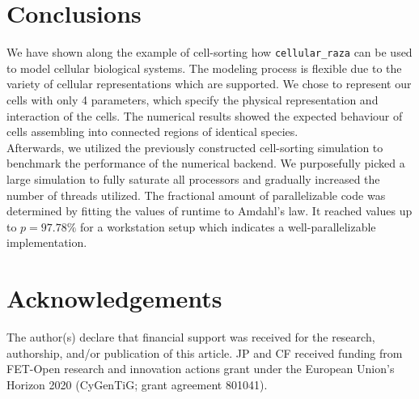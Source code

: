 \documentclass[fontsize=11pt,a4paper]{article}
\begin{document}
\section{Conclusions}\label{conclusions}

We have shown along the example of cell-sorting how \lstinline{cellular_raza} can be used to model
cellular biological systems.
The modeling process is flexible due to the variety of cellular representations which are supported.
We chose to represent our cells with only 4 parameters, which specify the physical representation
and interaction of the cells.
The numerical results showed the expected behaviour of cells assembling into connected regions of
identical species.\\
Afterwards, we utilized the previously constructed cell-sorting simulation to benchmark the
performance of the numerical backend.
We purposefully picked a large simulation to fully saturate all processors and gradually increased
the number of threads utilized.
The fractional amount of parallelizable code was determined by fitting the values of runtime to
Amdahl's law.
It reached values up to $p=97.78\%$ for a workstation setup which indicates a well-parallelizable
implementation.

\section{Acknowledgements} 

The author(s) declare that financial support was received for the research, authorship, and/or
publication of this article.
JP and CF received funding from FET-Open research and innovation actions grant
under the European Union’s Horizon 2020 (CyGenTiG; grant agreement 801041).



\end{document}
